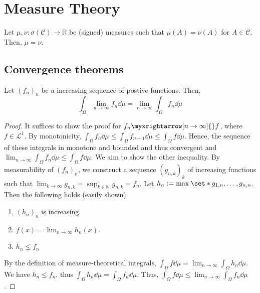 \section{Measure Theory}


\begin{thm}
    Let $\mu,\nu: \sigma(\mathcal{C}) \to \mathbb{R}$ be (signed) measures such that $\mu(A)=\nu(A)$ for $A\in \mathcal{C}$. Then, $\mu=\nu$.
\end{thm}




\subsection{Convergence theorems}


\begin{thm}
    Let $(f_n)_n$ be a increasing sequence of postive functions. Then,
    \[\int_\Omega \lim_{n\to\infty} f_n \dd{\mu} = \lim_{n\to\infty} \int_\Omega f_n \dd{\mu}\]
\end{thm}
\begin{proof}
  It suffices to show the proof for $f_n \myxrightarrow[n\to\infty]{}f$, where $f\in \mathcal{L}^1$. By monotonicity, \(\int_{\Omega}^{} f_n \dd{\mu} \leq \int_{\Omega}^{} f_{n+1} \dd{\mu}  \leq \int_{\Omega}^{} f \dd{\mu} \). Hence, the sequence of these integrals in monotone and bounded and thus convergent and $\allowbreak\lim_{n \to \infty} \int_{\Omega}^{} f_n \dd{\mu}  \leq \allowbreak \int_{\Omega}^{} f \dd{\mu} $. We aim to show the other inequality. By measurability of $(f_n)_n$, we construct a sequence \((g_{n,k})_{k }\) of increasing functions such that \(\lim_{k \to \infty} g_{n,k} = \sup_{k \in \mathbb{N}}g_{n,k}= f_n\). Let \(h_n:=\max_{} \set*{g_{1,n},\dots, g_{n,n} } \). Then the following holds (easily shown):
  \begin{enumerate}
    \item \((h_{n})_{n }\) is increasing.
    \item $f(x)=\lim_{n \to \infty} h_n(x)$.
    \item \(h_n \leq f_n \)
  \end{enumerate}
  By the definition of measure-theoretical integrals, \(\int_{\Omega}^{} f \dd{\mu} = \lim_{n \to \infty} \int_{\Omega}^{} h_n \dd{\mu} \). We have \(h_n \leq f_n\), thus \(\int_{\Omega}^{} h_n \dd{\mu} = \int_{\Omega}^{} f_n \dd{\mu} \). Thus, \(\int_{\Omega}^{} f \dd{\mu} \leq \lim_{n \to \infty} \int_{\Omega}^{} f_n \dd{\mu} \).
\end{proof}




